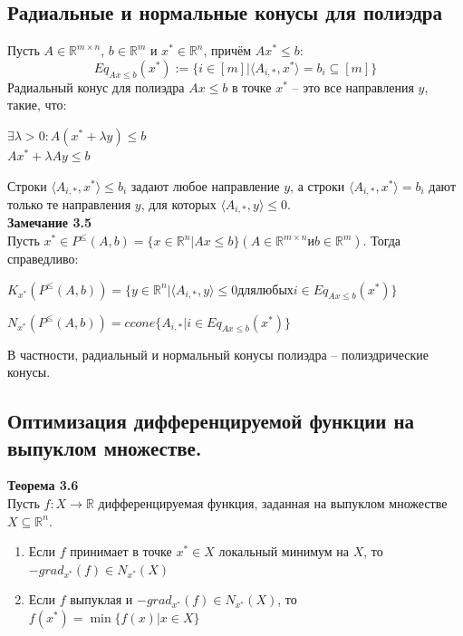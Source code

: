 \subsection{Радиальные и нормальные конусы для полиэдра}
Пусть $A\in\mathbb{R}^{m\times n}$, $b\in\mathbb{R}^{m}$ и $x^*\in\mathbb{R}^n$, причём $A x^*\leq b:$
\begin{equation*}
Eq_{Ax\leq b}(x^*):= \{i\in[m] | \langle A_{i,*},x^* \rangle = b_{i} \subseteq [m]\}
\end{equation*}
Радиальный конус для полиэдра $Ax \leq b$ в точке $x^*$ -- это все направления $y$, такие, что:
\begin{center}
$\exists \lambda > 0 : A(x^* + \lambda y) \leq b$\\
$A x^* + \lambda A y \leq b$\\
\end{center}
Строки $\langle A_{i,*},x^* \rangle \leq b_{i}$ задают любое направление $y$, а строки $\langle A_{i,*},x^* \rangle = b_{i}$ дают только те направления $y$, для которых $\langle A_{i,*},y \rangle \leq 0$.\\

\noindent\textbf{Замечание 3.5}\\
Пусть $x^*\in P^{\leq}(A,b) = \{x\in\mathbb{R}^n | Ax \leq b\} (A\in\mathbb{R}^{m \times n} и b\in\mathbb{R}^m)$. Тогда справедливо:
\begin{center}
    $K_{x^*}(P^{\leq}(A,b)) = \{y\in\mathbb{R}^n | \langle A_{i,*},y \rangle \leq 0 для любых i \in Eq_{Ax \leq b}(x^*)\}$\\
\end{center}
\begin{center}
    $N_{x^*}(P^{\leq}(A,b)) = ccone\{ A_{i,*} | i \in Eq_{Ax \leq b}(x^*)\}$\\
\end{center}
В частности, радиальный и нормальный конусы полиэдра -- полиэдрические конусы.\\

\subsection{Оптимизация дифференцируемой функции на выпуклом множестве.}
\textbf{Теорема 3.6}\\
Пусть $f: X \rightarrow \mathbb{R}$ дифференцируемая функция, заданная на выпуклом множестве $X\subseteq\mathbb{R}^n$.
\begin{enumerate}
    \item Если $f$ принимает в точке $x^*\in X$ локальный минимум на $X$, то $-grad_{x^*}(f)\in N_{x^*}(X)$
    \item Если $f$ выпуклая и $-grad_{x^*}(f)\in N_{x^*}(X)$, то $f(x^*)=\min\{f(x) | x \in X\}$\\
\end{enumerate}

